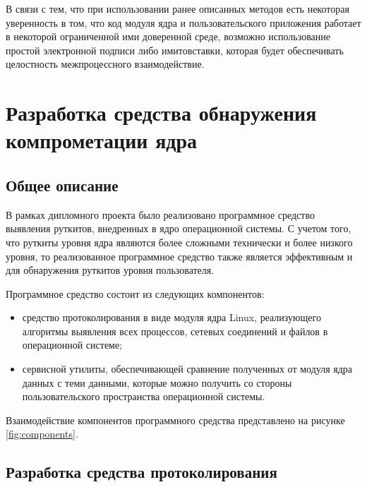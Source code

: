 \documentclass{gost7.32-2001}
\begin{document}
В связи с тем, что при использовании ранее описанных методов есть
некоторая уверенность в том, что код модуля ядра и пользовательского
приложения работает в некоторой ограниченной ими доверенной среде,
возможно использование простой электронной подписи либо имитовставки,
которая будет обеспечивать целостность межпроцессного взаимодействие.

\newpage
\section{Разработка средства обнаружения компрометации ядра}
\subsection{Общее описание}

В рамках дипломного проекта было реализовано программное средство
выявления руткитов, внедренных в ядро операционной системы. С учетом
того, что руткиты уровня ядра являются более сложными технически и
более низкого уровня, то реализованное программное средство также
является эффективным и для обнаружения руткитов уровня пользователя.

Программное средство состоит из следующих компонентов:
\begin{itemize}
\item
  средство протоколирования в виде модуля ядра Linux, реализующего
  алгоритмы выявления всех процессов, сетевых соединений и файлов в
  операционной системе;
\item
  сервисной утилиты, обеспечивающей сравнение полученных от модуля
  ядра данных с теми данными, которые можно получить со стороны
  пользовательского пространства операционной системы.
\end{itemize}

Взаимодействие компонентов программного средства представлено на
рисунке \ref{fig:components}.


\subsection{Разработка средства протоколирования}
\end{document}
